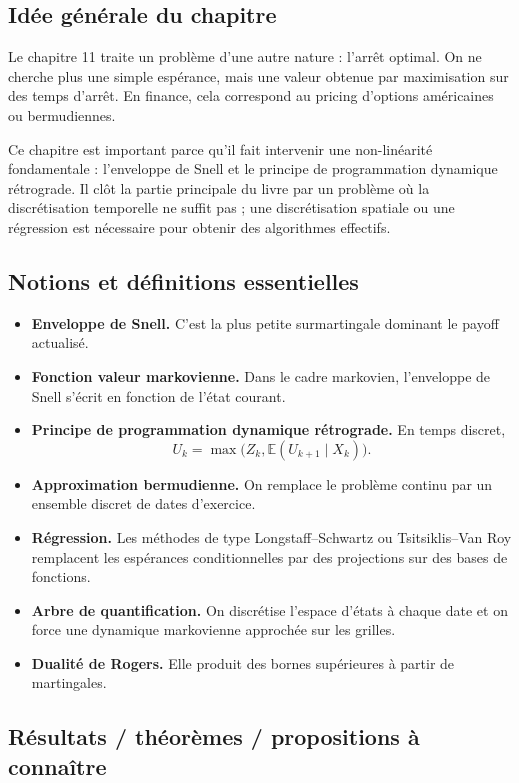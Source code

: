 \documentclass[11pt,a4paper]{article}
\newcommand{\E}{\mathbb{E}}
\begin{document}
\subsection{Idée générale du chapitre}

Le chapitre 11 traite un problème d'une autre nature : l'arrêt optimal. On ne cherche plus une simple espérance, mais une valeur obtenue par maximisation sur des temps d'arrêt. En finance, cela correspond au pricing d'options américaines ou bermudiennes.

Ce chapitre est important parce qu'il fait intervenir une non-linéarité fondamentale : l'enveloppe de Snell et le principe de programmation dynamique rétrograde. Il clôt la partie principale du livre par un problème où la discrétisation temporelle ne suffit pas ; une discrétisation spatiale ou une régression est nécessaire pour obtenir des algorithmes effectifs.

\subsection{Notions et définitions essentielles}

\begin{itemize}
  \item \textbf{Enveloppe de Snell.} C'est la plus petite surmartingale dominant le payoff actualisé.
  \item \textbf{Fonction valeur markovienne.} Dans le cadre markovien, l'enveloppe de Snell s'écrit en fonction de l'état courant.
  \item \textbf{Principe de programmation dynamique rétrograde.} En temps discret,
  \[
    U_k=\max\bigl(Z_k,\E(U_{k+1}\mid X_k)\bigr).
  \]
  \item \textbf{Approximation bermudienne.} On remplace le problème continu par un ensemble discret de dates d'exercice.
  \item \textbf{Régression.} Les méthodes de type Longstaff--Schwartz ou Tsitsiklis--Van Roy remplacent les espérances conditionnelles par des projections sur des bases de fonctions.
  \item \textbf{Arbre de quantification.} On discrétise l'espace d'états à chaque date et on force une dynamique markovienne approchée sur les grilles.
  \item \textbf{Dualité de Rogers.} Elle produit des bornes supérieures à partir de martingales.
\end{itemize}

\subsection{Résultats / théorèmes / propositions à connaître}
\end{document}

